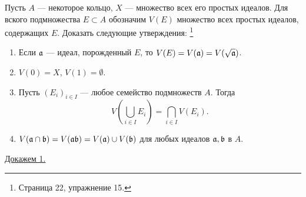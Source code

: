     \begin{Ex} \label{closed_set_prop}
        Пусть $A$ --- некоторое кольцо, $X$ --- множество всех его простых идеалов. Для вского подмножества $E \subset A$ обозначим $V(E)$ множество всех простых идеалов, содержащих 
        $E$. Доказать следующие утверждения: \footnote{\cite{A-M} Страница 22, упражнение 15.}
        \begin{enumerate}
            \item Если $\mathfrak{a}$ --- идеал, порожденный $E$, то $V(E) = V(\mathfrak{a}) = V(\sqrt{\mathfrak{a}})$.
            \item $V(0) = X$, $V(1) = \emptyset$.
            \item Пусть $(E_i)_{i \in I}$ --- любое семейство подмножеств $A$. Тогда 
                $$
                    V\left(\bigcup_{i \in I} E_i\right) = \bigcap_{i \in I} V(E_i).
                $$
            \item $V(\mathfrak{a} \cap \mathfrak{b}) = V(\mathfrak{ab}) = V(\mathfrak{a}) \cup V(\mathfrak{b})$ для любых идеалов $\mathfrak{a}, \mathfrak{b}$ в $A$.
        \end{enumerate}
    \end{Ex}
    \underline{Докажем 1.}
